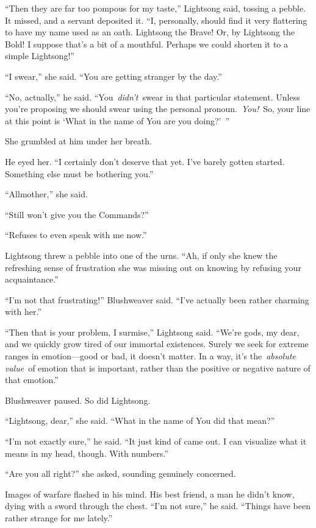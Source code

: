 “Then they are far too pompous for my taste,” Lightsong said, tossing a pebble. It missed, and a servant deposited it. “I, personally, should find it very flattering to have my name used as an oath. Lightsong the Brave! Or, by Lightsong the Bold! I suppose that’s a bit of a mouthful. Perhaps we could shorten it to a simple Lightsong!”

“I swear,” she said. “You are getting stranger by the day.”

“No, actually,” he said. “You~\textit{didn’t}~swear in that particular statement. Unless you’re proposing we should swear using the personal pronoun.~\textit{You!}~So, your line at this point is ‘What in the name of You are you doing?’~”

She grumbled at him under her breath.

He eyed her. “I certainly don’t deserve that yet. I’ve barely gotten started. Something else must be bothering you.”

“Allmother,” she said.

“Still won’t give you the Commands?”

“Refuses to even speak with me now.”

Lightsong threw a pebble into one of the urns. “Ah, if only she knew the refreshing sense of frustration she was missing out on knowing by refusing your acquaintance.”

“I’m not that frustrating!” Blushweaver said. “I’ve actually been rather charming with her.”

“Then that is your problem, I surmise,” Lightsong said. “We’re gods, my dear, and we quickly grow tired of our immortal existences. Surely we seek for extreme ranges in emotion—good or bad, it doesn’t matter. In a way, it’s the~\textit{absolute value}~of emotion that is important, rather than the positive or negative nature of that emotion.”

Blushweaver paused. So did Lightsong.

“Lightsong, dear,” she said. “What in the name of You did that mean?”

“I’m not exactly sure,” he said. “It just kind of came out. I can visualize what it means in my head, though. With numbers.”

“Are you all right?” she asked, sounding genuinely concerned.

Images of warfare flashed in his mind. His best friend, a man he didn’t know, dying with a sword through the chest. “I’m not sure,” he said. “Things have been rather strange for me lately.”

